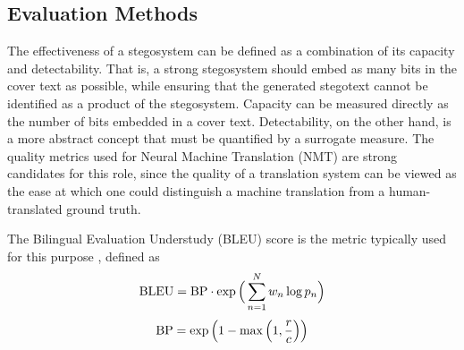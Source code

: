\documentclass[12pt,a4paper]{article}
\begin{document}

\subsection{Evaluation Methods}
\noindent The effectiveness of a stegosystem can be defined as a combination of its capacity and detectability. That is, a strong stegosystem should embed as many bits in the cover text as possible, while ensuring that the generated stegotext cannot be identified as a product of the stegosystem. Capacity can be measured directly as the number of bits embedded in a cover text. Detectability, on the other hand, is a more abstract concept that must be quantified by a surrogate measure. The quality metrics used for Neural Machine Translation (NMT) are strong candidates for this role, since the quality of a translation system can be viewed as the ease at which one could distinguish a machine translation from a human-translated ground truth. 

The Bilingual Evaluation Understudy (BLEU) score is the metric typically used for this purpose \cite{bleu}, defined as
\begin{equation}
\textnormal{BLEU} = \textnormal{BP} \cdot \exp\Big(\sum_{n=1}^Nw_n\log p_n\Big)
\end{equation}
\begin{equation}
\textnormal{BP} = \exp\Big(1 - \max\Big(1, \frac{r}{c}\Big)\Big)
\end{equation}


\end{document}
